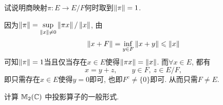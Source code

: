     \begin{ExtraExample}[Ps1022-5]
        试说明商映射$ \pi : E\to E/F $何时取到$ \left\| \pi \right\|=1 $.
    \end{ExtraExample}
    \begin{Solution}
    因为$ \left\| \pi \right\|=\sup\limits_{\left\| x \right\|\ne 0}\left\| \pi x \right\|/\left\| x \right\| $, 由
    \[
    \left\| x+F \right\|=\inf_{y\in F}\left\| x+y \right\|\leqslant \left\| x \right\|
    \]
    可知$ \left\| \pi \right\|=1 $当且仅当存在$ x\in E $使得$ \left\| \pi x \right\|=\left\| x \right\| $. 而$ \forall x\in E $, 都有
    \[
    x=y+z,\qquad y\in F,\ z\in E/F,
    \]
    即只需存在$ x\in E $使得$ y=0 $即可, 也即$ F^c\ne\{ 0 \} $即可. 从而只需$ F\ne E $.
    \end{Solution}

    \begin{ExtraExample}
        计算 $ \mathbb{M}_{2}(\mathbb{C}) $ 中投影算子的一般形式. 
    \end{ExtraExample}
